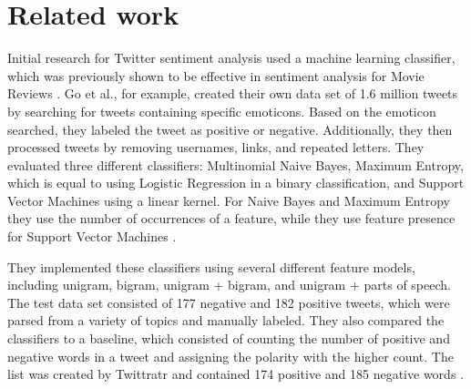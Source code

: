 \chapter{Related work}
\label{cha:Chapter2_RelatedWork}
\iffalse

Length: 1-2 pages

Effort: ~2 weeks

2-3 Arbeiten maximal, die genauer betrachtet werden
Ruhig mehr Zitate --> aber nicht detailliert betrachten
Introduction to Data Mining --> zu generell, nur als Zitat
Hier nur im engsten Sinne


Content
\begin{itemize}
\item Alec Go, Richa Bhayani, and Lei Huang. 2009. Twitter Sentiment Classification Using Distant Supervision.
Technical Report. Standford.
\item Taboada or Serendio or Vader?
\item Khuc et al.
\end{itemize}

\fi
Initial research for Twitter sentiment analysis used a machine learning classifier, which was previously shown to be effective in sentiment analysis for Movie Reviews \cite{GoBHaHua2009}. Go et al., for example, created their own data set of 1.6 million tweets by searching for tweets containing specific emoticons. Based on the emoticon searched, they labeled the tweet as positive or negative. Additionally, they then processed tweets by removing usernames, links, and repeated letters. They evaluated three different classifiers: Multinomial Naive Bayes, Maximum Entropy, which is equal to using Logistic Regression in a binary classification, and Support Vector Machines using a linear kernel. For Naive Bayes and Maximum Entropy they use the number of occurrences of a feature, while they use feature presence for Support Vector Machines \cite{GoBHaHua2009}. 

They implemented these classifiers using several different feature models, including unigram, bigram, unigram + bigram, and unigram + parts of speech. The test data set consisted of 177 negative and 182 positive tweets, which were parsed from a variety of topics and manually labeled. They also compared the classifiers to a baseline, which consisted of counting the number of positive and negative words in a tweet and assigning the polarity with the higher count. The list was created by Twittratr and contained 174 positive and 185 negative words \cite{GoBHaHua2009}. 

